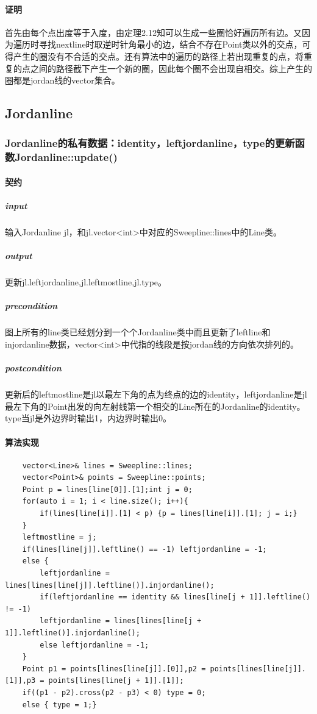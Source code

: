 \documentclass[a4paper]{book}
\numberwithin{equation}{chapter}
\theoremstyle{definition}
\begin{document}
\paragraph{证明}
首先由每个点出度等于入度，由定理2.12知可以生成一些圈恰好遍历所有边。又因为遍历时寻找nextline时取逆时针角最小的边，结合不存在Point类以外的交点，可得产生的圈没有不合适的交点。还有算法中的遍历的路径上若出现重复的点，将重复的点之间的路径截下产生一个新的圈，因此每个圈不会出现自相交。综上产生的圈都是jordan线的vector集合。

\subsection{Jordanline}
\subsubsection{Jordanline的私有数据：identity，leftjordanline，type的更新函数Jordanline::update()}
\paragraph{契约}
\subparagraph{input}
输入Jordanline jl，和jl.vector<int>中对应的Sweepline::lines中的Line类。
\subparagraph{output}
更新jl.leftjordanline,jl.leftmostline,jl.type。
\subparagraph{precondition}
图上所有的line类已经划分到一个个Jordanline类中而且更新了leftline和injordanline数据，vector<int>中代指的线段是按jordan线的方向依次排列的。
\subparagraph{postcondition}
更新后的leftmostline是jl以最左下角的点为终点的边的identity，leftjordanline是jl最左下角的Point出发的向左射线第一个相交的Line所在的Jordanline的identity。type当jl是外边界时输出1，内边界时输出0。
\paragraph{算法实现}
\begin{lstlisting}
	vector<Line>& lines = Sweepline::lines;
	vector<Point>& points = Sweepline::points;
	Point p = lines[line[0]].[1];int j = 0;
	for(auto i = 1; i < line.size(); i++){
		if(lines[line[i]].[1] < p) {p = lines[line[i]].[1]; j = i;}
	}
	leftmostline = j;
	if(lines[line[j]].leftline() == -1) leftjordanline = -1;
	else {
		leftjordanline = lines[lines[line[j]].leftline()].injordanline();
		if(leftjordanline == identity && lines[line[j + 1]].leftline() != -1) 
		leftjordanline = lines[lines[line[j + 1]].leftline()].injordanline();
		else leftjordanline = -1;
	}
	Point p1 = points[lines[line[j]].[0]],p2 = points[lines[line[j]].[1]],p3 = points[lines[line[j + 1]].[1]];
	if((p1 - p2).cross(p2 - p3) < 0) type = 0;
	else { type = 1;}
\end{lstlisting}
\end{document}
